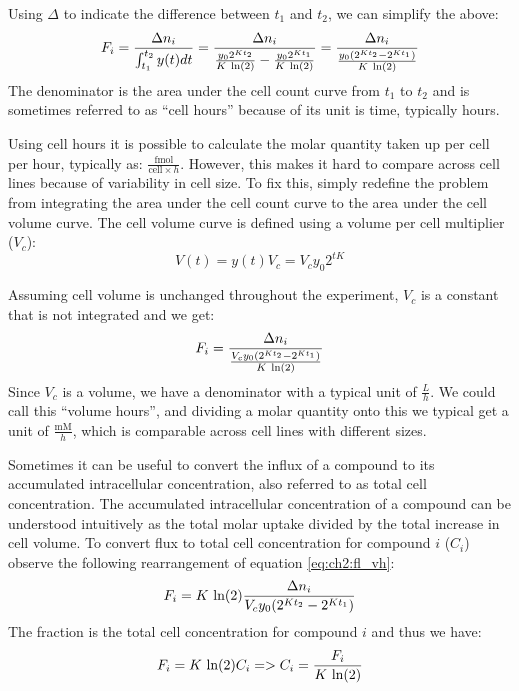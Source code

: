 Using $\Delta$ to indicate the difference between $t_1$ and $t_2$, we can simplify the above:
\begin{equation}
    F_i = \frac{\Delta n_i}{\int_{t_1}^{t_2} y(t) dt} = \frac{\Delta n_i}{\frac{y_0 2^{K t_2}}{K\ \natlog(2)} - \frac{y_0 2^{K t_1}}{K\ \natlog(2)}} = \frac{\Delta n_i}{\frac{y_0 (2^{K t_2} - 2^{K t_1})}{K\ \natlog(2)}}
\end{equation}
The denominator is the area under the cell count curve from $t_1$ to $t_2$ and is sometimes referred to as ``cell hours'' because of its unit is time, typically hours.

Using cell hours it is possible to calculate the molar quantity taken up per cell per hour, typically as: $\frac{\text{fmol}}{\text{cell}\times h}$.
However, this makes it hard to compare across cell lines because of variability in cell size.
To fix this, simply redefine the problem from integrating the area under the cell count curve to the area under the cell volume curve.
The cell volume curve is defined using a volume per cell multiplier ($V_c$):
\begin{equation}
    V(t) = y(t) V_c = V_c y_0 2^{t K}
\end{equation}

Assuming cell volume is unchanged throughout the experiment, $V_c$ is a constant that is not integrated and we get:
\begin{equation}
    F_i = \frac{\Delta n_i}{\frac{V_c y_0 (2^{K t_2} - 2^{K t_1})}{K\ \text{ln}(2)}}
\label{eq:ch2:fl_vh}
\end{equation}
Since $V_c$ is a volume, we have a denominator with a typical unit of $\frac{L}{h}$.
We could call this ``volume hours'', and dividing a molar quantity onto this we typical get a unit of $\frac{\text{mM}}{h}$, which is comparable across cell lines with different sizes.

Sometimes it can be useful to convert the influx of a compound to its accumulated intracellular concentration, also referred to as total cell concentration.
The accumulated intracellular concentration of a compound can be understood intuitively as the total molar uptake divided by the total increase in cell volume.
To convert flux to total cell concentration for compound $i$ ($C_i$) observe the following rearrangement of equation \ref{eq:ch2:fl_vh}:
\begin{equation}
    F_i = K\ \text{ln}(2) \frac{\Delta n_i}{V_c y_0 (2^{K t_2} - 2^{K t_1})}
\end{equation}
The fraction is the total cell concentration for compound $i$ and thus we have:
\begin{equation}
    F_i = K\ \text{ln}(2) C_i => C_i = \frac{F_i}{K\ \text{ln}(2)}
\end{equation}


